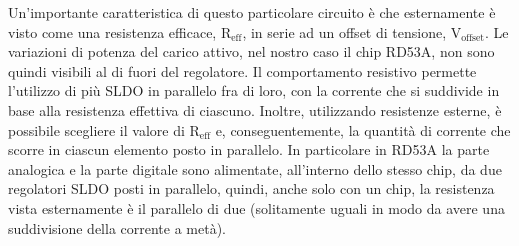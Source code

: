 Un'importante caratteristica di questo particolare circuito è che esternamente è visto come una resistenza efficace, $\mathrm{R_{eff}}$, in serie ad un offset di tensione, $\mathrm{V_{offset}}$.
Le variazioni di potenza del carico attivo, nel nostro caso il chip RD53A, non sono quindi visibili al di fuori del regolatore.
Il comportamento resistivo permette l'utilizzo di più SLDO in parallelo fra di loro, con la corrente che si suddivide in base alla resistenza effettiva di ciascuno.
Inoltre, utilizzando resistenze esterne, è possibile scegliere il valore di $\mathrm{R_{eff}}$ e, conseguentemente, la quantità di corrente che scorre in ciascun elemento posto in parallelo.
In particolare in RD53A la parte analogica e la parte digitale sono alimentate, all'interno dello stesso chip, da due regolatori SLDO posti in parallelo, quindi, anche solo con un chip, la resistenza vista esternamente è il parallelo di due (solitamente uguali in modo da avere una suddivisione della corrente a metà).

